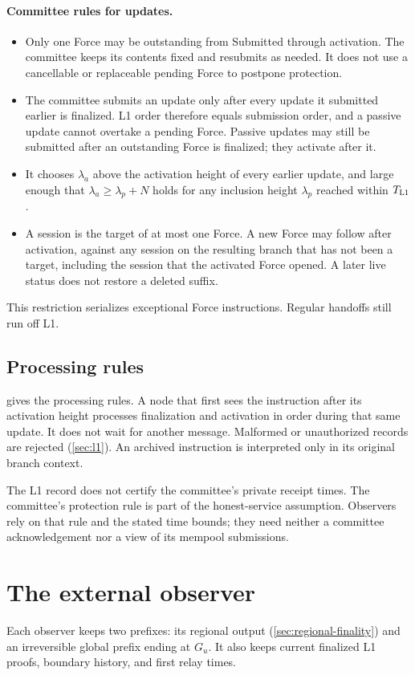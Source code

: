 \documentclass[11pt,a4paper]{article}
\begin{document}
\paragraph{Committee rules for updates.}
\begin{itemize}
\item Only one Force may be outstanding from Submitted through activation.
The committee keeps its contents fixed and resubmits as needed. It does
not use a cancellable or replaceable pending Force to postpone protection.
\item The committee submits an update only after every update
it submitted earlier is finalized. L1 order therefore equals submission
order, and a passive update cannot overtake a pending Force. Passive
updates may still be submitted after an outstanding Force is finalized;
they activate after it.
\item It chooses $\lambda_a$ above the activation height of every
earlier update, and large enough that $\lambda_a\ge\lambda_p+N$ holds
for any inclusion height $\lambda_p$ reached within $T_{\rm L1}$.
\item A session is the target of at most one Force. A new
Force may follow after activation, against any session on the
resulting branch that has not been a target, including the session that
the activated Force opened. A later live status does not restore
a deleted suffix.
\end{itemize}
This restriction serializes exceptional Force instructions. Regular
handoffs still run off L1.

\subsection{Processing rules}
 gives the processing rules. A node that first sees the instruction after its activation height
processes finalization and activation in order during that same update.
It does not wait for another message. Malformed or unauthorized records
are rejected (\cref{sec:l1}). An archived
instruction is interpreted only in its original branch context.

The L1 record does not certify the committee's private receipt times.
The committee's protection rule is part of the honest-service assumption.
Observers rely on that rule and the stated time bounds; they need neither
a committee acknowledgement nor a view of its mempool submissions.

\section{The external observer}
\label{sec:observers}
Each observer keeps two prefixes: its regional output
(\cref{sec:regional-finality}) and an
irreversible global prefix ending at $G_u$. It also keeps current
finalized L1 proofs, boundary history, and first relay times.
\end{document}
